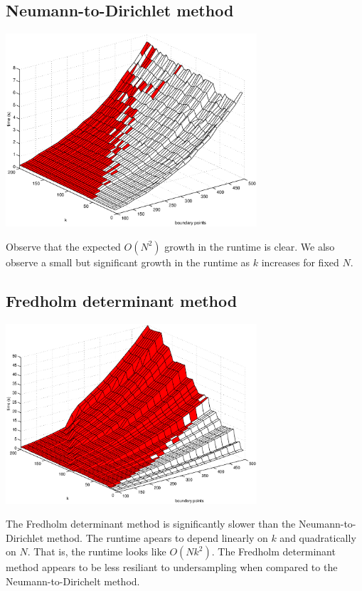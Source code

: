 \documentclass{article}
\begin{document}
\subsection{Neumann-to-Dirichlet method}
\begin{center}
\includegraphics[width=0.7\textwidth]{dtn.eps} \\
\end{center}
Observe that the expected $O(N^2)$ growth in the runtime is clear.
We also observe a small but significant growth in the runtime as $k$ increases for fixed $N$.
\subsection{Fredholm determinant method}
\begin{center}
\includegraphics[width=0.7\textwidth]{fd.eps} \\
\end{center}
The Fredholm determinant method is significantly slower than the Neumann-to-Dirichlet method.
The runtime apears to depend linearly on $k$ and quadratically on $N$.
That is, the runtime looks like $O(Nk^2)$.
The Fredholm determinant method appears to be less resiliant to undersampling when compared to the Neumann-to-Dirichelt method.
\end{document}
